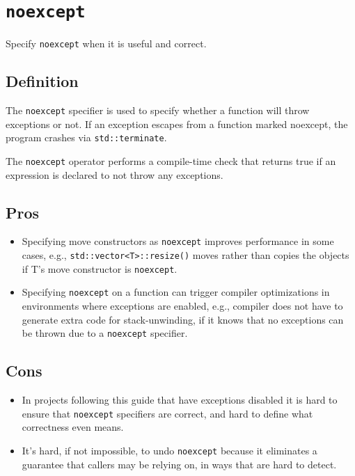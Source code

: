 
\section{\texorpdfstring{\texttt{noexcept}}{}}\label{sec:noexcept}
Specify \texttt{noexcept} when it is useful and correct.

\subsection{Definition}
The \texttt{noexcept} specifier is used to specify whether a function will throw exceptions or not. If an exception escapes from a function marked noexcept, the program crashes via \texttt{std::terminate}.

The \texttt{noexcept} operator performs a compile-time check that returns true if an expression is declared to not throw any exceptions.

\subsection{Pros}
\begin{itemize}
    \item Specifying move constructors as \texttt{noexcept} improves performance in some cases, e.g., \texttt{std::vector<T>::resize()} moves rather than copies the objects if T's move constructor is \texttt{noexcept}.
    \item Specifying \texttt{noexcept} on a function can trigger compiler optimizations in environments where exceptions are enabled, e.g., compiler does not have to generate extra code for stack-unwinding, if it knows that no exceptions can be thrown due to a \texttt{noexcept} specifier.
\end{itemize}

\subsection{Cons}
\begin{itemize}
    \item In projects following this guide that have exceptions disabled it is hard to ensure that \texttt{noexcept} specifiers are correct, and hard to define what correctness even means.
    \item It's hard, if not impossible, to undo \texttt{noexcept} because it eliminates a guarantee that callers may be relying on, in ways that are hard to detect.
\end{itemize}

